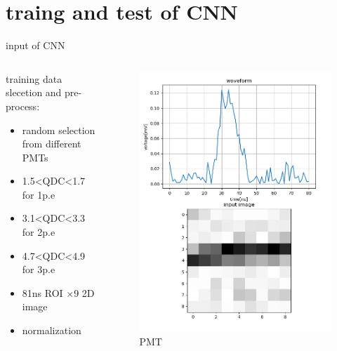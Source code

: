 \documentclass[11pt,compress,xcolor=x11names,UTF8]{beamer}
\begin{document}
\section{traing and test of CNN}
\begin{frame}{input of CNN}
\begin{columns}
\begin{column}{.49\textwidth}
training data slecetion and pre-process:
	\begin{itemize}
		\item random selection from different PMTs
		\item 1.5<QDC<1.7 for 1p.e
		\item 3.1<QDC<3.3 for 2p.e
		\item 4.7<QDC<4.9 for 3p.e
		\item 81ns ROI $\times$9 2D image 
		\item normalization
	\end{itemize}
\end{column}
\begin{column}{.49\textwidth}
\begin{figure}[!h]
\centering
\includegraphics[width=.9\textwidth]{figure/onepe.png} %
\caption{PMT}
\end{figure}
\end{column}
\end{columns}
\end{frame}
\end{document}
